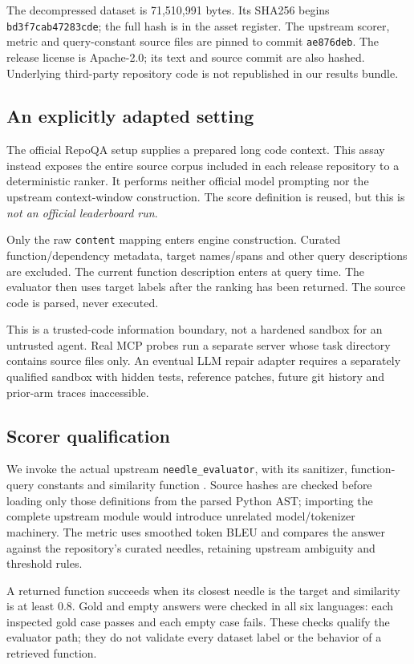 \documentclass[11pt]{article}
\begin{document}
The decompressed dataset is 71,510,991 bytes. Its SHA256 begins \texttt{bd3f7cab47283cde}; the full hash is in the asset register. The upstream scorer, metric and query-constant source files are pinned to commit \texttt{ae876deb}. The release license is Apache-2.0; its text and source commit are also hashed. Underlying third-party repository code is not republished in our results bundle.

\subsection{An explicitly adapted setting}
The official RepoQA setup supplies a prepared long code context. This assay instead exposes the entire source corpus included in each release repository to a deterministic ranker. It performs neither official model prompting nor the upstream context-window construction. The score definition is reused, but this is \emph{not an official leaderboard run}.

Only the raw \texttt{content} mapping enters engine construction. Curated function/dependency metadata, target names/spans and other query descriptions are excluded. The current function description enters at query time. The evaluator then uses target labels after the ranking has been returned. The source code is parsed, never executed.

This is a trusted-code information boundary, not a hardened sandbox for an untrusted agent. Real MCP probes run a separate server whose task directory contains source files only. An eventual LLM repair adapter requires a separately qualified sandbox with hidden tests, reference patches, future git history and prior-arm traces inaccessible.

\subsection{Scorer qualification}
We invoke the actual upstream \texttt{needle\_evaluator}, with its sanitizer, function-query constants and similarity function \citep{repoqasource}. Source hashes are checked before loading only those definitions from the parsed Python AST; importing the complete upstream module would introduce unrelated model/tokenizer machinery. The metric uses smoothed token BLEU and compares the answer against the repository's curated needles, retaining upstream ambiguity and threshold rules.

A returned function succeeds when its closest needle is the target and similarity is at least 0.8. Gold and empty answers were checked in all six languages: each inspected gold case passes and each empty case fails. These checks qualify the evaluator path; they do not validate every dataset label or the behavior of a retrieved function.
\end{document}
